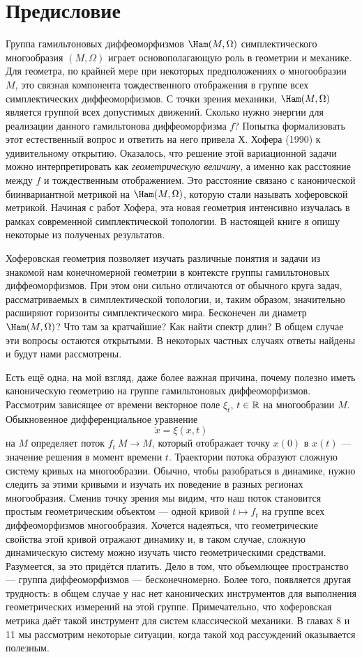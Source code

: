 \chapter*{Предисловие}

Группа гамильтоновых диффеоморфизмов $\Ham(M,\Omega)$ симплектического
многообразия $(M,\Omega)$ играет
основополагающую роль в геометрии и
механике.
Для геометра, по крайней мере при некоторых предположениях
о многообразии $M$, это связная компонента тождественного отображения
в группе всех симплектических диффеоморфизмов.
С точки зрения
механики, $\Ham(M,\Omega)$ является группой всех допустимых движений.
Сколько нужно энергии для реализации данного гамильтонова диффеоморфизма $f$?
Попытка формализовать этот естественный вопрос и ответить на него привела Х. Хофера \cite{H1} (1990) к удивительному открытию.
Оказалось, что решение этой вариационной задачи можно интерпретировать как {}\emph{геометрическую величину}, а именно как расстояние между $f$ и тождественным
отображением.
Это расстояние связано с канонической биинвариантной метрикой на $\Ham(M,\Omega)$, которую стали называть хоферовской метрикой.
Начиная с работ Хофера, эта новая геометрия интенсивно изучалась в рамках современной
симплектической топологии.
В настоящей книге я опишу некоторые из полученых результатов.

Хоферовская геометрия позволяет изучать различные понятия и задачи из знакомой нам конечномерной геометрии в контексте группы гамильтоновых диффеоморфизмов.
При этом они сильно отличаются от обычного круга задач, рассматриваемых в симплектической топологии, и, таким образом, значительно расширяют горизонты симплектического мира.
Бесконечен ли диаметр $\Ham(M,\Omega)$?
Что там за кратчайшие?
Как найти спектр длин?
В общем случае эти вопросы остаются открытыми.
В некоторых частных случаях ответы найдены и будут нами рассмотрены.

Есть ещё одна, на мой взгляд, даже более важная причина, почему полезно иметь каноническую геометрию на группе гамильтоновых диффеоморфизмов.
Рассмотрим зависящее от времени векторное поле $\xi_t$, $t\in \mathbb{R}$ на многообразии $M$.
Обыкновенное дифференциальное уравнение
\[\dot x=\xi(x,t)\]
на $M$ определяет поток $f_t\: M \to M$, который отображает точку $x(0)$ в $x(t)$ — значение решения в момент времени $t$.
Траектории потока образуют сложную систему кривых на многообразии.
Обычно, чтобы разобраться в динамике, нужно следить за этими кривыми и изучать их поведение в разных регионах многообразия.
Сменив точку зрения мы видим, что наш поток становится простым
геометрическим объектом — одной кривой $t \mapsto f_t$ на группе всех диффеоморфизмов многообразия.
Хочется надеяться, что геометрические свойства этой кривой отражают динамику и, в таком случае, сложную динамическую систему можно изучать чисто геометрическими средствами. 
Разумеется, за это придётся платить.
Дело в том, что объемлющее пространство — группа
диффеоморфизмов — бесконечномерно.
Более того, появляется другая трудность:
в общем случае у нас нет канонических инструментов для выполнения геометрических измерений на этой группе.
Примечательно, что хоферовская метрика даёт такой инструмент для систем классической механики.
В главах 8 и 11 мы рассмотрим некоторые ситуации,
когда такой ход рассуждений оказывается полезным.

